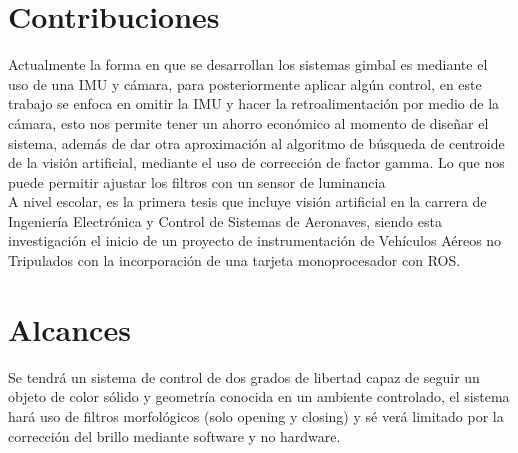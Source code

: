 \section{Contribuciones}
Actualmente la forma en que se desarrollan los sistemas gimbal es mediante el uso de una IMU y cámara, para posteriormente aplicar algún control, en este trabajo se enfoca en omitir
la IMU y hacer la retroalimentación por medio de la cámara, esto nos permite tener un ahorro económico al momento de diseñar el sistema, además de dar otra aproximación al
algoritmo de búsqueda de centroide de la visión artificial, mediante el uso de corrección de factor gamma. Lo que nos puede permitir ajustar los filtros con un sensor de luminancia\\
A nivel escolar, es la primera tesis que incluye visión artificial en la carrera de Ingeniería Electrónica y Control de Sistemas de Aeronaves,
siendo esta investigación el inicio de un proyecto de instrumentación de Vehículos Aéreos no Tripulados con la incorporación de una tarjeta monoprocesador con ROS.

\section{Alcances}
Se tendrá un sistema de control de dos grados de libertad capaz de seguir un objeto de color sólido y geometría conocida en un ambiente controlado, el sistema hará uso
de filtros morfológicos (solo opening y closing) y sé verá limitado por la corrección del brillo mediante software y no hardware.


